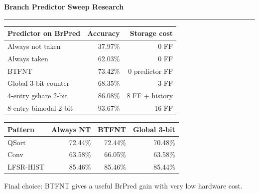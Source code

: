 \documentclass[12pt]{article}
\newcommand{\slidetitle}[1]{%
  {\LARGE\bfseries #1}\par
  \vspace{0.2em}\hrule\vspace{0.7em}
}
\newcommand{\newslide}{\clearpage}
\begin{document}
\newslide
\slidetitle{Branch Predictor Sweep Research}
\begin{center}
\begin{tabular}{|l|r|r|}
\hline
Predictor on BrPred & Accuracy & Storage cost \\
\hline
Always not taken & 37.97\% & 0 FF \\
Always taken & 62.03\% & 0 FF \\
BTFNT & 73.42\% & 0 predictor FF \\
Global 3-bit counter & 68.35\% & 3 FF \\
4-entry gshare 2-bit & 86.08\% & 8 FF + history \\
8-entry bimodal 2-bit & 93.67\% & 16 FF \\
\hline
\end{tabular}
\end{center}
\vspace{0.2in}
\begin{center}
\begin{tabular}{|l|r|r|r|}
\hline
Pattern & Always NT & BTFNT & Global 3-bit \\
\hline
QSort & 72.44\% & 72.44\% & 70.48\% \\
Conv & 63.58\% & 66.05\% & 63.58\% \\
LFSR-HIST & 85.46\% & 85.46\% & 85.44\% \\
\hline
\end{tabular}
\end{center}
Final choice: BTFNT gives a useful BrPred gain with very low hardware cost.
\end{document}
